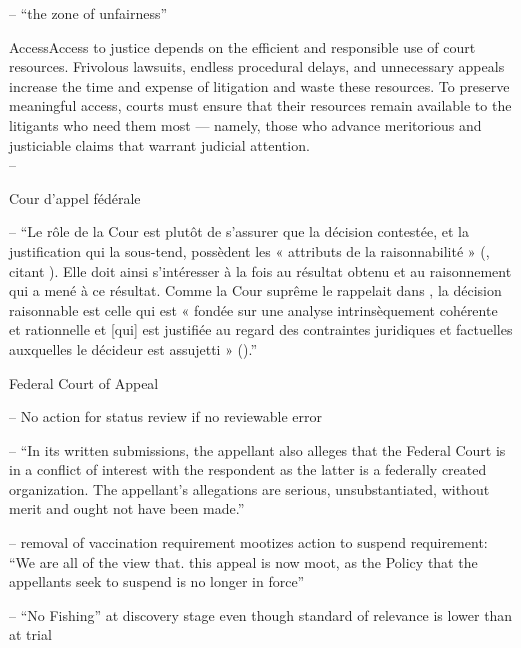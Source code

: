 \p -- ``the zone of unfairness''

\begin{casequote}{Access}Access to justice depends on the efficient and responsible use of court resources. Frivolous lawsuits, endless procedural delays, and unnecessary appeals increase the time and expense of litigation and waste these resources. To preserve meaningful access, courts must ensure that their resources remain available to the litigants who need them most — namely, those who advance meritorious and justiciable claims that warrant judicial attention. \\[0.8\baselineskip]
-- 
\end{casequote}

\p 	Cour d'appel fédérale

\p -- \enquote{Le rôle de la Cour est plutôt de s’assurer que la décision contestée, et la justification qui la sous-tend, possèdent les « attributs de la raisonnabilité » (, citant ). Elle doit ainsi s’intéresser à la fois au résultat obtenu et au raisonnement qui a mené à ce résultat. Comme la Cour suprême le rappelait dans , la décision raisonnable est celle qui est « fondée sur une analyse intrinsèquement cohérente et rationnelle et [qui] est justifiée au regard des contraintes juridiques et factuelles auxquelles le décideur est assujetti » ().} 



\bigskip
{}

\p Federal Court of Appeal

\p -- No action for status review if no reviewable error

\p -- \enquote{In its written submissions, the appellant also alleges that the Federal Court is in a conflict of interest with the respondent as the latter is a federally created organization. The appellant’s allegations are serious, unsubstantiated, without merit and ought not have been made.}

\p -- removal of vaccination requirement mootizes action to suspend requirement: \enquote{We are all of the view that. this appeal is now moot, as the Policy that the appellants seek to suspend is no longer in force} 

\p -- ``No Fishing'' at discovery stage even though standard of relevance is lower than at trial


